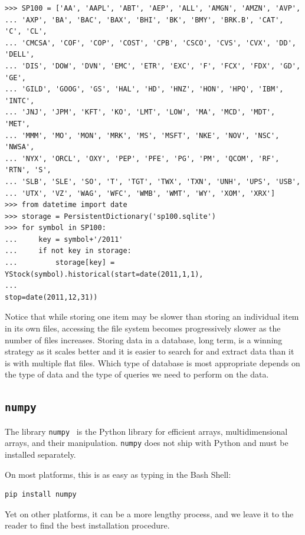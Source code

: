 \documentclass[justified,sixbynine]{tufte-book}
\def\ft{\small\tt}
\theoremstyle{plain}%
\theoremstyle{definition}
\theoremstyle{remark}
\begin{document}
\begin{fullwidth}
\begin{lstlisting}[caption={in file: {\ft nlib.py}}]
>>> SP100 = ['AA', 'AAPL', 'ABT', 'AEP', 'ALL', 'AMGN', 'AMZN', 'AVP',
... 'AXP', 'BA', 'BAC', 'BAX', 'BHI', 'BK', 'BMY', 'BRK.B', 'CAT', 'C', 'CL',
... 'CMCSA', 'COF', 'COP', 'COST', 'CPB', 'CSCO', 'CVS', 'CVX', 'DD', 'DELL',
... 'DIS', 'DOW', 'DVN', 'EMC', 'ETR', 'EXC', 'F', 'FCX', 'FDX', 'GD', 'GE',
... 'GILD', 'GOOG', 'GS', 'HAL', 'HD', 'HNZ', 'HON', 'HPQ', 'IBM', 'INTC',
... 'JNJ', 'JPM', 'KFT', 'KO', 'LMT', 'LOW', 'MA', 'MCD', 'MDT', 'MET',
... 'MMM', 'MO', 'MON', 'MRK', 'MS', 'MSFT', 'NKE', 'NOV', 'NSC', 'NWSA',
... 'NYX', 'ORCL', 'OXY', 'PEP', 'PFE', 'PG', 'PM', 'QCOM', 'RF', 'RTN', 'S',
... 'SLB', 'SLE', 'SO', 'T', 'TGT', 'TWX', 'TXN', 'UNH', 'UPS', 'USB',
... 'UTX', 'VZ', 'WAG', 'WFC', 'WMB', 'WMT', 'WY', 'XOM', 'XRX']
>>> from datetime import date
>>> storage = PersistentDictionary('sp100.sqlite')
>>> for symbol in SP100:
...     key = symbol+'/2011'
...     if not key in storage:
...         storage[key] = YStock(symbol).historical(start=date(2011,1,1),
...                                                  stop=date(2011,12,31))
\end{lstlisting}

Notice that while storing one item may be slower than storing an individual item in its own files, accessing the file system becomes progressively slower as the number of files increases. Storing data in a database, long term, is a winning strategy as it scales better and it is easier to search for and extract data than it is with multiple flat files. Which type of database is most appropriate depends on the type of data and the type of queries we need to perform on the data.


\goodbreak\subsection{{\ft numpy}}

The library {\ft numpy}~\cite{numpy} is the Python library for efficient arrays, multidimensional arrays, and their manipulation. {\ft numpy} does not ship with Python and must be installed separately.

On most platforms, this is as easy as typing in the Bash Shell:
\begin{lstlisting}
pip install numpy
\end{lstlisting}
Yet on other platforms, it can be a more lengthy process, and we leave it to the reader to find the best installation procedure.


\end{fullwidth}
\end{document}
